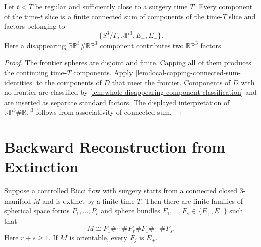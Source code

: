 \begin{lemma}
\label{lem:single-surgery-connected-sum-reconstruction}
\notready
Let $t<T$ be regular and sufficiently close to a surgery time $T$.  Every
component of the time-$t$ slice is a finite connected sum of components of the
time-$T$ slice and factors belonging to
\[
 \{S^3/\Gamma,\mathbb{RP}^3,E_+,E_-\}.
\]
Here a disappearing $\mathbb{RP}^3\#\mathbb{RP}^3$ component contributes two
$\mathbb{RP}^3$ factors.
\end{lemma}

\begin{proof}
The frontier spheres are disjoint and finite.  Capping all of them produces
the continuing time-$T$ components.  Apply
\ref{lem:local-capping-connected-sum-identities} to the components of $D$ that
meet the frontier.  Components of $D$ with no frontier are classified by
\ref{lem:whole-disappearing-component-classification} and are inserted as
separate standard factors.  The displayed interpretation of
$\mathbb{RP}^3\#\mathbb{RP}^3$ follows from associativity of connected sum.
\end{proof}

\section{Backward Reconstruction from Extinction}

\begin{theorem}
\label{thm:extinction-connected-sum-classification}
\notready
Suppose a controlled Ricci flow with surgery starts from a connected closed
$3$-manifold $M$ and is extinct by a finite time $T$.  Then there are finite
families of spherical space forms $P_1,\ldots,P_r$ and sphere bundles
$F_1,\ldots,F_s\in\{E_+,E_-\}$ such that
\[
 M\cong P_1\#\cdots\#P_r\#F_1\#\cdots\#F_s.
\]
Here $r+s\ge1$.
If $M$ is orientable, every $F_j$ is $E_+$.
\end{theorem}


